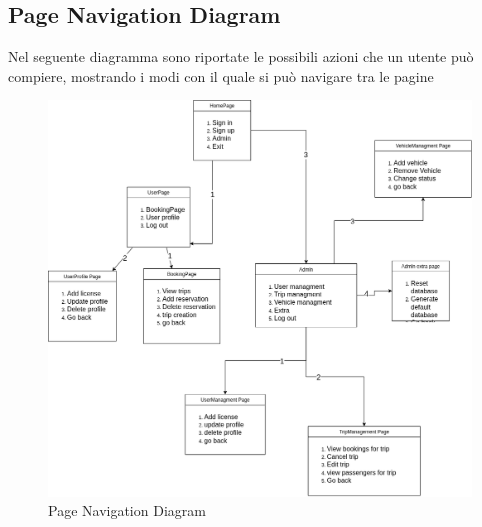 \subsection{Page Navigation Diagram}\label{subsec:PageNavigation}
Nel seguente diagramma sono riportate le possibili azioni che un utente può compiere, mostrando i modi con il quale si può navigare tra le pagine
\begin{figure}[H]
    \centering
    \includegraphics[width=1\linewidth]{Images/PageNavigation_diag.png}
    \caption{Page Navigation Diagram}
    \label{fig:PageNavdiag}
\end{figure}
